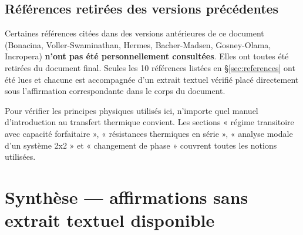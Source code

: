 \documentclass[11pt,a4paper]{article}
\begin{document}
\subsection{Références retirées des versions précédentes}

\begin{honnete}
Certaines références citées dans des versions antérieures de ce document
(Bonacina, Voller-Swaminathan, Hermes, Bacher-Madsen, Gosney-Olama, Incropera)
\textbf{n'ont pas été personnellement consultées}. Elles ont toutes été retirées du
document final. Seules les 10 références listées en \S\ref{sec:references} ont été
lues et chacune est accompagnée d'un extrait textuel vérifié placé directement sous
l'affirmation correspondante dans le corps du document.

Pour vérifier les principes physiques utilisés ici, n'importe quel manuel d'introduction au
transfert thermique convient. Les sections « régime transitoire avec capacité forfaitaire »,
« résistances thermiques en série », « analyse modale d'un système 2x2 » et « changement de
phase » couvrent toutes les notions utilisées.
\end{honnete}


\section{Synthèse — affirmations sans extrait textuel disponible}\label{sec:synthese_choix}
\end{document}
